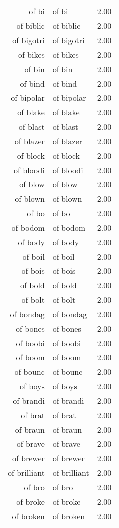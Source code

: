 \begin{table}[ht]
\begin{tabular}{rlr}
  of bi & of bi & 2.00 \\ 
  of biblic & of biblic & 2.00 \\ 
  of bigotri & of bigotri & 2.00 \\ 
  of bikes & of bikes & 2.00 \\ 
  of bin & of bin & 2.00 \\ 
  of bind & of bind & 2.00 \\ 
  of bipolar & of bipolar & 2.00 \\ 
  of blake & of blake & 2.00 \\ 
  of blast & of blast & 2.00 \\ 
  of blazer & of blazer & 2.00 \\ 
  of block & of block & 2.00 \\ 
  of bloodi & of bloodi & 2.00 \\ 
  of blow & of blow & 2.00 \\ 
  of blown & of blown & 2.00 \\ 
  of bo & of bo & 2.00 \\ 
  of bodom & of bodom & 2.00 \\ 
  of body & of body & 2.00 \\ 
  of boil & of boil & 2.00 \\ 
  of bois & of bois & 2.00 \\ 
  of bold & of bold & 2.00 \\ 
  of bolt & of bolt & 2.00 \\ 
  of bondag & of bondag & 2.00 \\ 
  of bones & of bones & 2.00 \\ 
  of boobi & of boobi & 2.00 \\ 
  of boom & of boom & 2.00 \\ 
  of bounc & of bounc & 2.00 \\ 
  of boys & of boys & 2.00 \\ 
  of brandi & of brandi & 2.00 \\ 
  of brat & of brat & 2.00 \\ 
  of braun & of braun & 2.00 \\ 
  of brave & of brave & 2.00 \\ 
  of brewer & of brewer & 2.00 \\ 
  of brilliant & of brilliant & 2.00 \\ 
  of bro & of bro & 2.00 \\ 
  of broke & of broke & 2.00 \\ 
  of broken & of broken & 2.00 \\ 

\end{tabular}
\end{table}
